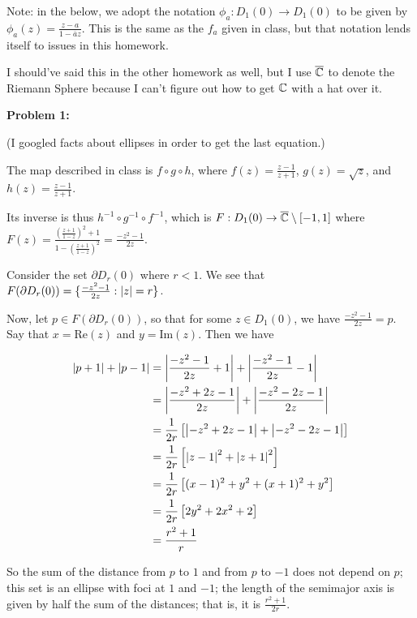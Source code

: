 \documentclass[a4paper,12pt]{article}
\begin{document}
Note: in the below, we adopt the notation $\phi_a: D_1(0) \to D_1(0)$ to be given by $\phi_a(z) = \frac{z-a}{1-\overline{a}z}$. This is the same as the $f_a$ given in class, but that notation lends itself to issues in this homework. 

I should've said this in the other homework as well, but I use $\overline{\mathbb{C}}$ to denote the Riemann Sphere because I can't figure out how to get $\mathbb{C}$ with a hat over it.

{\bf Problem 1:}

(I googled facts about ellipses in order to get the last equation.)

The map described in class is $f\circ g \circ h$, where $f(z) = \frac{z-1}{z+1}$, $g(z) = \sqrt{z}$, and $h(z) = \frac{z-1}{z+1}$.

Its inverse is thus $h^{-1} \circ g^{-1} \circ f^{-1}$, which is $F: D_1(0) \to \overline{\mathbb{C}} \setminus [-1,1]$ where $F(z) = \frac{\left(\frac{z+1}{1-z}\right)^2 + 1}{1-\left(\frac{z+1}{1-z}\right)^2} = \frac{-z^2-1}{2z}$.

Consider the set $\partial D_r(0)$ where $r < 1$. We see that $F(\partial D_r(0)) = \{\frac{-z^2-1}{2z}: \left\lvert z \right\rvert = r\}$.

Now, let $p \in F(\partial D_r(0))$, so that for some $z \in D_1(0)$, we have $\frac{-z^2-1}{2z} = p$. Say that $x = \text{Re}(z)$ and $y = \text{Im}(z)$. Then we have

\begin{align*}
\left\lvert p+1 \right\rvert + \left\lvert p-1 \right\rvert &= \left\lvert \frac{-z^2 -1}{2z} + 1 \right\rvert + \left\lvert \frac{-z^2 -1}{2z} -1 \right\rvert\\
&= \left\lvert \frac{-z^2 +2z-1}{2z} \right\rvert + \left\lvert \frac{-z^2 -2z-1}{2z} \right\rvert\\
&= \frac{1}{2r}\left[\left\lvert -z^2 +2z-1 \right\rvert + \left\lvert -z^2 -2z-1 \right\rvert\right]\\
&= \frac{1}{2r}\left[\left\lvert z-1 \right\rvert^2 + \left\lvert z+1 \right\rvert^2\right]\\
&= \frac{1}{2r}\left[(x-1)^2+y^2 + (x+1)^2+y^2\right]\\
&= \frac{1}{2r}\left[2y^2+2x^2+2\right]\\
&= \frac{r^2+1}{r}\\
\end{align*}

So the sum of the distance from $p$ to $1$ and from $p$ to $-1$ does not depend on $p$; this set is an ellipse with foci at $1$ and $-1$; the length of the semimajor axis is given by half the sum of the distances; that is, it is $\frac{r^2+1}{2r}$. 
\end{document}
